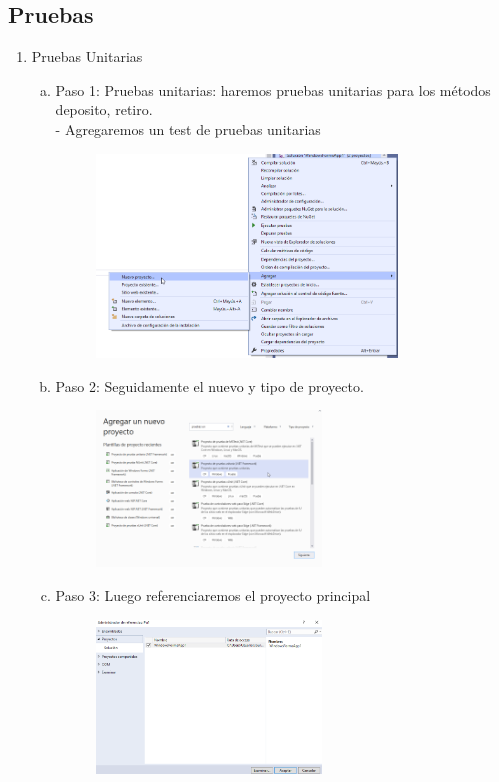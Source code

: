 \subsection{Pruebas}
\begin{enumerate}[1.]
	\item Pruebas Unitarias
	\begin{enumerate}[a)]
	\item Paso 1: Pruebas unitarias: haremos pruebas unitarias para los métodos deposito, retiro.\\
		-  Agregaremos un test de pruebas unitarias
		\begin{figure}[H]
		\begin{center}
		\includegraphics[width=8cm]{./Imagenes/imp1}
		\end{center}
		\end{figure}
	\item Paso 2: Seguidamente el nuevo y tipo de proyecto.
		\begin{figure}[H]
		\begin{center}
		\includegraphics[width=6cm]{./Imagenes/imp2}
		\end{center}
		\end{figure}
	\item Paso 3: Luego referenciaremos el proyecto principal
		\begin{figure}[H]
		\begin{center}
		\includegraphics[width=6cm]{./Imagenes/imp3}

\end{center}
\end{figure}
\end{enumerate}
\end{enumerate}
